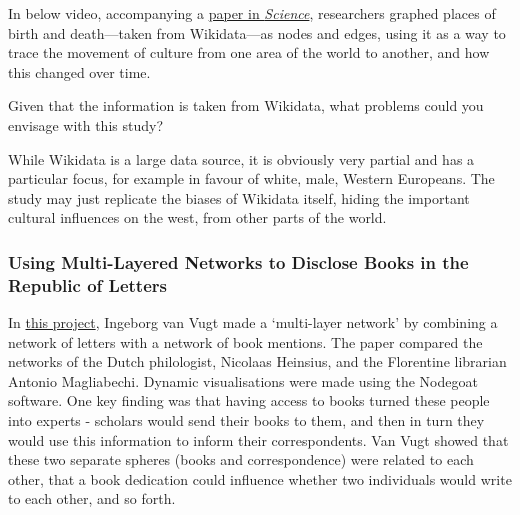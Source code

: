 \documentclass[
]{book}
\begin{document}
In below video, accompanying a \href{https://www.science.org/doi/10.1126/science.1240064}{paper in \emph{Science}}, researchers graphed places of birth and death---taken from Wikidata---as nodes and edges, using it as a way to trace the movement of culture from one area of the world to another, and how this changed over time.

Given that the information is taken from Wikidata, what problems could you envisage with this study?

While Wikidata is a large data source, it is obviously very partial and has a particular focus, for example in favour of white, male, Western Europeans. The study may just replicate the biases of Wikidata itself, hiding the important cultural influences on the west, from other parts of the world.

\hypertarget{using-multi-layered-networks-to-disclose-books-in-the-republic-of-letters}{%
\subsubsection{\texorpdfstring{\textbf{Using Multi-Layered Networks to Disclose Books in the Republic of Letters}}{Using Multi-Layered Networks to Disclose Books in the Republic of Letters}}\label{using-multi-layered-networks-to-disclose-books-in-the-republic-of-letters}}

In \href{https://jhnr.uni.lu/index.php/jhnr/article/view/7}{this project}, Ingeborg van Vugt made a `multi-layer network' by combining a network of letters with a network of book mentions. The paper compared the networks of the Dutch philologist, Nicolaas Heinsius, and the Florentine librarian Antonio Magliabechi. Dynamic visualisations were made using the Nodegoat software. One key finding was that having access to books turned these people into experts - scholars would send their books to them, and then in turn they would use this information to inform their correspondents. Van Vugt showed that these two separate spheres (books and correspondence) were related to each other, that a book dedication could influence whether two individuals would write to each other, and so forth.
\end{document}
